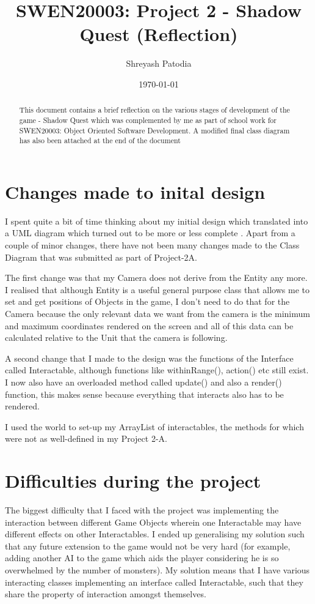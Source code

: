 \documentclass[a4paper]{article}
\title{SWEN20003: Project 2 - Shadow Quest (Reflection)}
\author{Shreyash Patodia}
\date{\today}
\begin{document}
\maketitle

\begin{abstract}
This document contains a brief reflection on the various stages of development of the game - Shadow Quest which was complemented by me as part of school work for SWEN20003: Object Oriented Software Development. A modified final class diagram has also been attached at the end of the document
\end{abstract}

\section{Changes made to inital design}
\label{sec:introduction}

I spent quite a bit of time thinking about my initial design which translated into a UML  diagram which turned out to be more or less complete . Apart from a couple of minor changes, there have not been many changes made to the Class Diagram that was submitted as part of Project-2A. 

The first change was that my Camera does not derive from the Entity any more. I realised that although Entity is a useful general purpose class that allows me to set and get positions of Objects in the game, I don't need to do that for the Camera because the only relevant data we want from the camera is the minimum and maximum coordinates rendered on the screen and all of this data can be calculated relative to the Unit that the camera is following. 

A second change that I made to the design was the functions of the Interface called Interactable, although functions like withinRange(), action() etc still exist. I now also have an overloaded method called update() and also a render() function, this makes sense because everything that interacts also has to be rendered. 

I used the world to set-up my ArrayList of interactables, the methods for which were not as well-defined in my Project 2-A.

\section{Difficulties during the project}
\label{sec:theory}

The biggest difficulty that I faced with the project was implementing the interaction between different Game Objects wherein one Interactable may have different effects on other Interactables. I ended up generalising my solution such that any future extension to the game would not be very hard (for example, adding another AI to the game which aids the player considering he is so overwhelmed by the number of monsters). My solution means that I have various interacting classes implementing an interface called Interactable, such that they share the property of interaction amongst themselves. 
\end{document}
